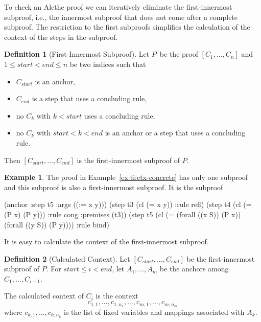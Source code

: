 \documentclass{scrartcl}
\theoremstyle{definition}
\newtheorem{example}{Example}
\newtheorem{definition}{Definition}[example]
\begin{document}
To check an Alethe proof we can iteratively eliminate the first-innermost
subproof, i.e., the innermost subproof that does not come after a
complete subproof.  The restriction to the first subproofs simplifies
the calculation of the context of the steps in the subproof.

\begin{definition}[First-Innermost Subproof]
  Let $P$\, be the proof $[C_1, \dots, C_n]$ and $1 \leq \mathit{start}
  < \mathit{end} \leq n$ be two indices such that
  \begin{itemize}
    \item $C_{\mathit{start}}$ is an anchor,
    \item $C_{\mathit{end}}$ is a step that uses a concluding rule,
    \item no $C_k$ with $k < \mathit{start}$ uses a concluding rule,
    \item no $C_k$ with $\mathit{start} < k < \mathit{end}$ is an anchor or
     a step that uses a concluding rule.
  \end{itemize}
  Then $[C_{\mathit{start}}, \dots, C_{\mathit{end}}]$ is the
  first-innermost subproof of $P$.
\end{definition}

\begin{example}
The proof in Example~\ref{ex:ti:ctx-concrete} has only one subproof
and this subproof is also a first-innermost subproof.  It is the subproof
\begin{AletheVerb}
(anchor :step t5 :args ((:= x y)))
(step t3 (cl (= x y)) :rule refl)
(step t4 (cl (= (P x) (P y))) :rule cong :premises (t3))
(step t5 (cl (= (forall ((x S)) (P x)) (forall ((y S)) (P y))))
                              :rule bind)
\end{AletheVerb}
\end{example}

\noindent
It is easy to calculate the context of the first-innermost subproof.

\begin{definition}[Calculated Context]
  Let $[C_{\mathit{start}}, \dots, C_{\mathit{end}}]$ be
  the first-innermost subproof of $P$.
  For $\mathit{start} \leq i < \mathit{end}$, let
  $A_1, \dots, A_m$ be the anchors among $C_1, \dots, C_{i-1}$.

  The calculated context of $C_i$ is the context
  \[
  c_{1,1}, \dots, c_{1, n_1}, \dots, c_{m,1}, \dots, c_{m, n_m}
  \]
  where $c_{k,1}, \dots, c_{k, n_k}$ is the list of fixed variables
  and mappings associated with $A_k$.
\end{definition}
\end{document}

